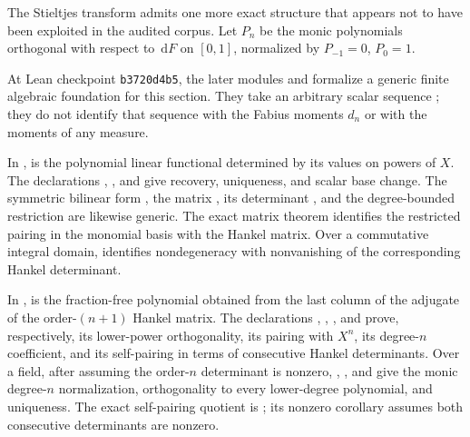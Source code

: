 \documentclass[11pt,oneside]{article}
\theoremstyle{definition}
\theoremstyle{remark}
\newcommand{\dd}{\,\mathrm d}
\newcommand{\1}{\mathbf 1}
\begin{document}
The Stieltjes transform admits one more exact structure that appears not to have been exploited in the audited corpus.  Let $P_n$ be the monic polynomials orthogonal with respect to $\dd F$ on $[0,1]$, normalized by $P_{-1}=0$, $P_0=1$.

\begin{statusbox}
At Lean checkpoint \texttt{b3720d4b5}, the later modules
 and  formalize a generic finite
algebraic foundation for this section.  They take an arbitrary scalar sequence
; they do not identify that sequence with the Fabius moments
$d_n$ or with the moments of any measure.

In ,  is the polynomial
linear functional determined by its values on powers of $X$.  The declarations
,
, and
 give recovery, uniqueness, and scalar base change.
The symmetric bilinear form , the matrix
, its determinant
, and the degree-bounded restriction
 are likewise generic.  The exact matrix theorem
 identifies the restricted pairing in the
monomial basis with the Hankel matrix.  Over a commutative integral domain,
 identifies nondegeneracy with
nonvanishing of the corresponding Hankel determinant.

In ,  is the
fraction-free polynomial obtained from the last column of the adjugate of the
order-$(n+1)$ Hankel matrix.  The declarations
,
,
, and
 prove, respectively, its
lower-power orthogonality, its pairing with $X^n$, its degree-$n$ coefficient, and its
self-pairing in terms of consecutive Hankel determinants.  Over a field, after assuming
the order-$n$ determinant is nonzero,
,
, and
 give the
monic degree-$n$ normalization, orthogonality to every lower-degree polynomial, and
uniqueness.  The exact self-pairing quotient is
; its nonzero corollary assumes
both consecutive determinants are nonzero.


\end{statusbox}
\end{document}
